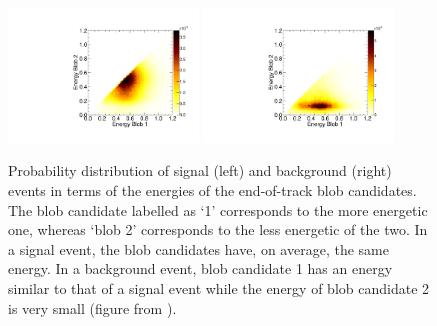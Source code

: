\documentclass[a4paper,11pt]{article}
\begin{document}
\begin{figure}[!htb]
\centering
\includegraphics[width=0.45\textwidth]{fig/EnergyBlobsSignal.pdf}
\includegraphics[width=0.45\textwidth]{fig/EnergyBlobsTl208.pdf}
\caption{Probability distribution of signal (left) and background (right) events in terms of the energies of the end-of-track blob candidates. The blob candidate labelled as `1' corresponds to the more energetic one, whereas `blob 2' corresponds to the less energetic of the two. In a signal event, the blob candidates have, on average, the same energy. In a background event, blob candidate 1 has an energy similar to that of a signal event while the energy of blob candidate 2 is very small (figure from \cite{NEXT_sensitivity}).} \label{fig.BLOBS}
\end{figure}
\end{document}
